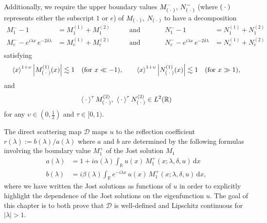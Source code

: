 \documentclass[../dissertation.tex]{subfiles}
\begin{document}
\begin{defn}
	Additionally, we require the upper boundary values $M_{(\kern 0.5ex \cdot \kern 0.5ex)}^-$, $N_{(\kern 0.5ex \cdot \kern 0.5ex)}^-$
	(where $(\kern 0.5ex \cdot \kern 0.5ex)$ represents either the subscript $1$ or $e$) of 
	$M_{(\kern 0.5ex \cdot \kern 0.5ex)}$, $N_{(\kern 0.5ex \cdot \kern 0.5ex)}$ to have a decomposition 
	\begin{align*}
		M_1^- - 1 &= M_1^{(1)} + M_1^{(2)} \qquad &\text{and}& \qquad
		&N_1^- - 1 &= N_1^{(1)} + N_1^{(2)} \\
		M_e^- - e^{i\lambda x}\,e^{-2\delta\lambda} &= M_e^{(1)} + M_e^{(2)} \qquad &\text{and}& \qquad
		&N_e^- - e^{i\lambda x}\,e^{-2\delta\lambda} &= N_e^{(1)} + N_e^{(2)} \\
	\end{align*}
	satisfying 
	\begin{align*}
		\left\langle x \right\rangle^{1+\upsilon} \left|M_{(\kern 0.5ex \cdot \kern 0.5ex)}^{(1)}(x)\right| \lesssim 1 
			\quad (\text{for } x \ll -1), \qquad 
		\left\langle x \right\rangle^{1+\upsilon} \left|N_{(\kern 0.5ex \cdot \kern 0.5ex)}^{(1)}(x)\right| \lesssim 1
			\quad (\text{for } x \gg 1),
	\end{align*}
	and
	\begin{align*}
		\left\langle \kern 0.5ex \cdot \kern 0.5ex \right\rangle^\tau M_{(\kern 0.5ex \cdot \kern 0.5ex)}^{(2)}, 
			~\left\langle \kern 0.5ex \cdot \kern 0.5ex \right\rangle^\tau N_{(\kern 0.5ex \cdot \kern 0.5ex)}^{(2)} \in L^2(\mathbb R)
	\end{align*}
	for any $\upsilon \in \left(0,\frac{1}{2}\right)$ and $\tau \in [0,1)$.
\end{defn}

The direct scattering map 
$\mathscr D$ maps $u$ to the reflection coef{}ficient 
$r(\lambda) := b(\lambda) / a(\lambda)$ where $a$ and $b$ are determined by 
the following formulas involving the boundary value $M_1^+$ of the Jost solution
$M_1$
\begin{subequations}
	\label{eq3:ScatData}
	\begin{align}
		\label{eq3:ScatDataA}
		a(\lambda) 
			&= 1 + i \alpha(\lambda) 
				\int_{\mathbb R} 
					u(x) \, M_1^+(x;\lambda, \delta, u) 
				\, \mathrm{d}x \\
		\label{eq3:ScatDataB}
		b(\lambda)
			&= i \beta(\lambda) 
				\int_{\mathbb R} 
					e^{-i\lambda x} \, u(x) \, M_1^+(x; \lambda, \delta, u)
				\, \mathrm{d}x,
	\end{align}
\end{subequations}
where we have written the Jost solutions as functions of $u$ in order to 
explicitly highlight the dependence of the Jost solutions on the eigenfunction $u$.
The goal of this chapter is to both prove that $\mathscr D$ is well-defined and
Lipschitz continuous for $|\lambda| > 1$.
\end{document}

